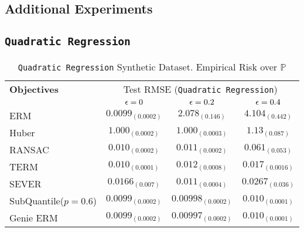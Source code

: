 \documentclass{article} %
\newcommand{\subhead}[1]{\multicolumn{1}{c}{#1}}%
\begin{document}
\begin{appendices}
	\newpage
	
	\section{Additional Experiments}
	\label{app:additional-experiments}
	\subsection{\texttt{Quadratic Regression}}
	\begin{table}[!h]
	\centering
	\begin{tabular}{lccc}
		\toprule 
		\textbf{Objectives}&\multicolumn{3}{c}{Test RMSE (\texttt{Quadratic Regression})}\\                   
		\cmidrule(rl){2-4}
		&\subhead{${\epsilon} = 0$}& \subhead{${\epsilon} = 0.2$}& \subhead{${\epsilon} = 0.4$}\\ 
		\midrule
		ERM  &$0.0099_{(0.0002)}$&$2.078_{(0.146)}$&$4.104_{(0.442)}$\\
		Huber \cite{Huber2009} &$1.000_{(0.0002)}$&$1.000_{(0.0003)}$&$1.13_{(0.087)}$\\
		RANSAC \cite{RANSAC1981} &$0.010_{(0.0002)}$&$0.011_{(0.0002)}$&$0.061_{(0.053)}$\\
		TERM \cite{li2020tilted} &$0.010_{(0.0001)}$&$0.012_{(0.0008)}$&$0.017_{(0.0016)}$\\
		SEVER \cite{DiakonikolasKKLSS19} &$0.0166_{(0.007)}$&$0.011_{(0.0004)}$&$0.0267_{(0.036)}$\\
		\rowcolor{LightCyan}
		SubQuantile($p = 0.6$) &$\mathbf{0.0099_{(0.0002)}}$&$\mathbf{0.00998_{(0.0002)}}$&$\mathbf{0.010_{(0.0001)}}$\\
		\midrule 
		Genie ERM &$0.0099_{(0.0002)}$&$0.00997_{(0.0002)}$&$0.010_{(0.0001)}$\\
		\bottomrule
	\end{tabular}
	\caption{\texttt{Quadratic Regression} Synthetic Dataset. Empirical Risk over $\mathbb{P}$}
	\label{tab:quadratic-regression}
	\end{table}


\end{appendices}
\end{document}

